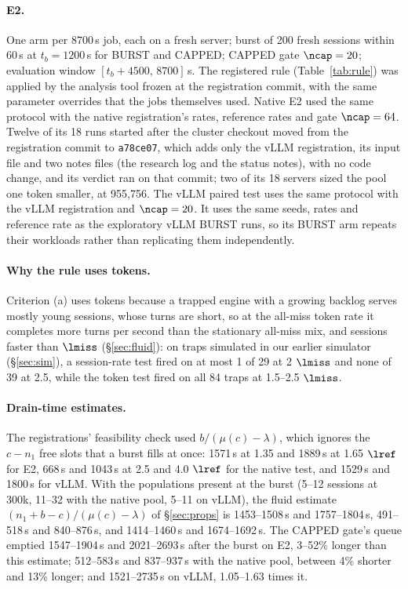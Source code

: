 \paragraph{E2.} One arm per 8700\,s job, each on a fresh server; burst of 200 fresh sessions within 60\,s at $t_b=1200$\,s for BURST and CAPPED; CAPPED gate $\ncap=20$; evaluation window $[t_b+4500,\,8700]$\,s. The registered rule (Table~\ref{tab:rule}) was applied by the analysis tool frozen at the registration commit, with the same parameter overrides that the jobs themselves used. Native E2 used the same protocol with the native registration's rates, reference rates and gate $\ncap=64$. Twelve of its 18 runs started after the cluster checkout moved from the registration commit to \texttt{a78ce07}, which adds only the vLLM registration, its input file and two notes files (the research log and the status notes), with no code change, and its verdict ran on that commit; two of its 18 servers sized the pool one token smaller, at 955,756. The vLLM paired test uses the same protocol with the vLLM registration and $\ncap=20$. It uses the same seeds, rates and reference rate as the exploratory vLLM BURST runs, so its BURST arm repeats their workloads rather than replicating them independently.

\paragraph{Why the rule uses tokens.} Criterion (a) uses tokens because a trapped engine with a growing backlog serves mostly young sessions, whose turns are short, so at the all-miss token rate it completes more turns per second than the stationary all-miss mix, and sessions faster than $\lmiss$ (\S\ref{sec:fluid}): on traps simulated in our earlier simulator (\S\ref{sec:sim}), a session-rate test fired on at most 1 of 29 at 2 $\lmiss$ and none of 39 at 2.5, while the token test fired on all 84 traps at 1.5--2.5 $\lmiss$.

\paragraph{Drain-time estimates.} The registrations' feasibility check used $b/(\mu(c)-\lambda)$, which ignores the $c-n_1$ free slots that a burst fills at once: 1571\,s at 1.35 and 1889\,s at 1.65 $\lref$ for E2, 668\,s and 1043\,s at 2.5 and 4.0 $\lref$ for the native test, and 1529\,s and 1800\,s for vLLM. With the populations present at the burst (5--12 sessions at 300k, 11--32 with the native pool, 5--11 on vLLM), the fluid estimate $(n_1+b-c)/(\mu(c)-\lambda)$ of \S\ref{sec:props} is 1453--1508\,s and 1757--1804\,s, 491--518\,s and 840--876\,s, and 1414--1460\,s and 1674--1692\,s. The CAPPED gate's queue emptied 1547--1904\,s and 2021--2693\,s after the burst on E2, 3--52\% longer than this estimate; 512--583\,s and 837--937\,s with the native pool, between 4\% shorter and 13\% longer; and 1521--2735\,s on vLLM, 1.05--1.63 times it.

